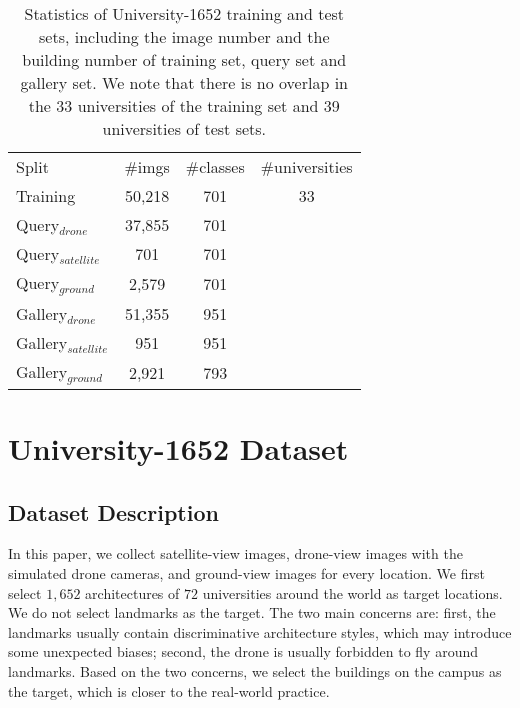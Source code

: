 \documentclass[sigconf]{acmart}
\begin{document}
\setlength{\tabcolsep}{12pt}
\begin{table}
\small
\begin{center}
\begin{tabular}{l|c|c|c}
\hline
Split & \#imgs & \#classes & \#universities\\
\shline
 Training & 50,218 & 701 & 33 \\
 \hline
 Query$_{drone}$ & 37,855 & 701 &  \multirow{6}{0.1\linewidth}{\centering{39}}\\
 Query$_{satellite}$& 701 & 701 & \\
 Query$_{ground}$ & 2,579 & 701 & \\
 Gallery$_{drone}$& 51,355 & 951 & \\
 Gallery$_{satellite}$ & 951 & 951 & \\
 Gallery$_{ground}$ & 2,921 & 793 & \\
\hline
\end{tabular}
\end{center}
\caption{Statistics of University-1652 training and test sets, including the image number and the building number of training set, query set and gallery set. We note that there is no overlap in the 33 universities of the training set and 39 universities of test sets.
}
\label{table:Statistics}
\end{table}

\section{University-1652 Dataset} \label{sec:dataset}
\subsection{Dataset Description}
In this paper, we collect  satellite-view images, drone-view images with the simulated drone cameras, and ground-view images for every location. We first select $1,652$ architectures of $72$ universities around the world as target locations. We do not select landmarks as the target. The two main concerns are: first, the landmarks usually contain discriminative architecture styles, which may introduce some unexpected biases; second, the drone is usually forbidden to fly around landmarks. Based on the two concerns, we select the buildings on the campus as the target, which is closer to the real-world practice. 
\end{document}

